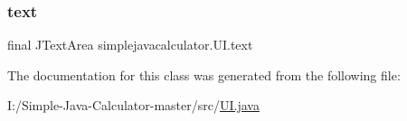 \mbox{\label{classsimplejavacalculator_1_1_u_i_ad63dddeb78adb3942b218d236236bb75}} 
\subsubsection{\texorpdfstring{text}{text}}
{\footnotesize\ttfamily final J\+Text\+Area simplejavacalculator.\+U\+I.\+text\hspace{0.3cm}{\ttfamily [private]}}



The documentation for this class was generated from the following file\+:\begin{DoxyCompactItemize}
\item 
I\+:/\+Simple-\/\+Java-\/\+Calculator-\/master/src/\mbox{\hyperlink{_u_i_8java}{U\+I.\+java}}\end{DoxyCompactItemize}
